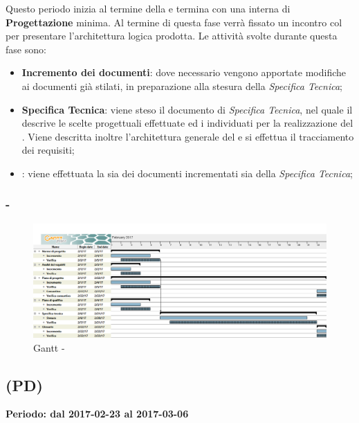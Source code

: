 \documentclass[./PianoDiProgetto.tex]{subfiles}
\begin{document}
\begin{itemize}
  Questo periodo inizia al termine della \PerAD{} e termina con una  interna di \textbf{\label{Revisione} Progettazione} minima. Al termine di questa fase verrà fissato un incontro col  per presentare l'architettura logica prodotta. Le attività svolte durante questa fase sono:
  \begin{itemize}
    \item \textbf{Incremento dei documenti}: dove necessario vengono apportate modifiche ai documenti già stilati, in preparazione alla stesura della \textit{Specifica Tecnica};
    \item \textbf{Specifica Tecnica}: viene steso il documento di \textit{Specifica Tecnica}, nel quale il \PJ{} descrive le scelte progettuali effettuate ed i  individuati per la realizzazione del . Viene descritta inoltre l'architettura generale del  e si effettua il tracciamento dei requisiti;
    \item \textbf{}: viene effettuata la  sia dei documenti incrementati sia della \textit{Specifica Tecnica};
  \end{itemize}

  \end{itemize}
  \newpage
  \subsubsection{ - \PerPA}
    \begin{figure}[!h]
    \centering
    \includegraphics[width=\textwidth]{images/PA}
    \caption{Gantt - \PerPA}
    \end{figure}

  \subsection{\PerPD{} (PD)}
  \textbf{Periodo: dal 2017-02-23 al 2017-03-06}
\end{document}
